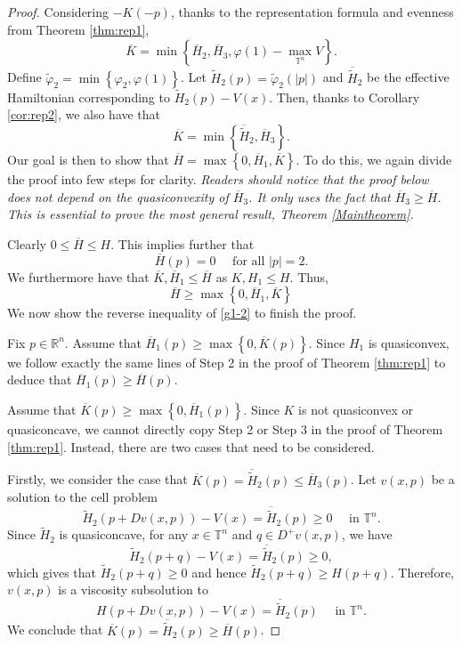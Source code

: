 \documentclass[12pt,reqno]{amsart}
\theoremstyle{plain}
\theoremstyle{remark}
\numberwithin{equation}{section}
\newcommand{\R}{\mathbb{R}}
\newcommand{\T}{\mathbb{T}}
\newcommand{\ol}{\overline}
\begin{document}
\begin{proof} Considering $-K(-p)$,  thanks to the representation formula and evenness from Theorem \ref{thm:rep1},
\[
\ol{K}=\min\left\{\ol{H}_2, \ol{H}_3, \varphi(1)-\max_{\T^n} V \right\}.
\]
Define $\tilde \varphi_2 = \min\left\{\varphi_2, \varphi(1)\right\}$.
Let $\tilde H_2(p) = \tilde \varphi_2(|p|)$ and $\ol{\tilde H}_2$ be the effective Hamiltonian corresponding to $\tilde H_2(p)- V(x)$.
Then, thanks to Corollary \ref{cor:rep2}, we also have that
\begin{equation}\label{g0-1}
\ol{K} = \min \left\{ \ol{\tilde H}_2, \ol{H}_3 \right\}.
\end{equation}
Our goal is then to show that $\ol{H} = \max\left\{0, \ol{H}_1, \ol{K}\right\}$.
To do this, we again divide the proof into few steps for clarity. 
{\it Readers should notice that the proof below does not depend on  the quasiconvexity of $\ol{H}_3$.  
It only uses the fact that  $\ol{H}_3\geq \ol{H}$. 
This is essential to prove the most general result, Theorem \ref{Maintheorem}.}
\smallskip

 Clearly $0 \leq \ol{H} \leq H$. This implies further that
\begin{equation} \label{g1-1}
\ol{H}(p)=0 \quad \text{ for all } |p|=2.
\end{equation}
We furthermore have that $\ol{K}, \ol{H}_1 \leq \ol{H}$ as $K, H_1 \leq H$. Thus,
\begin{equation}\label{g1-2}
\ol{H} \geq \max\left\{0, \ol{H}_1, \ol{K}\right\}
\end{equation}
We now show the reverse inequality of \eqref{g1-2} to finish the proof.
\smallskip

 Fix $p \in \R^n$.
Assume that $\ol{H}_1(p) \geq \max\left\{0, \ol{K}(p) \right\}$.  Since $H_1$ is quasiconvex, 
we follow exactly the same lines of Step 2 in the proof of Theorem \ref{thm:rep1}
to deduce that $\ol{H}_1(p) \geq \ol{H}(p)$.
\smallskip

 Assume that $\ol{K}(p) \geq \max\left\{0, \ol{H}_1(p) \right\}$.  Since $K$ is not quasiconvex or quasiconcave,  we cannot directly copy Step 2 or Step 3 in the proof of Theorem \ref{thm:rep1}.   Instead,  there are two cases that need to be considered.

Firstly, we consider the case that $\ol{K}(p) = \ol{\tilde H}_2(p) \leq \ol{H}_3(p)$.
Let $v(x,p)$ be a solution to the cell problem
\begin{equation}\label{g3-1}
\tilde H_2(p+Dv(x,p)) - V(x)=\ol{\tilde H}_2(p) \geq 0 \quad \text{ in } \T^n.
\end{equation}
Since $\tilde H_2$ is quasiconcave, for any $x \in \T^n$ and $q \in D^+v(x,p)$, we have
\[
\tilde H_2(p+q) - V(x)= \ol{\tilde H}_2(p) \geq 0,
\]
which gives that $\tilde H_2(p+q) \geq 0$ and hence $\tilde H_2(p+q) \geq H(p+q)$.
Therefore, $v(x,p)$ is a viscosity subsolution to
\[
H(p+Dv(x,p)) - V(x) = \ol{\tilde H}_2(p) \quad \text{ in } \T^n.
\]
We conclude that $\ol{K}(p) = \ol{\tilde H}_2(p) \geq \ol{H}(p)$.


\end{proof}
\end{document}
